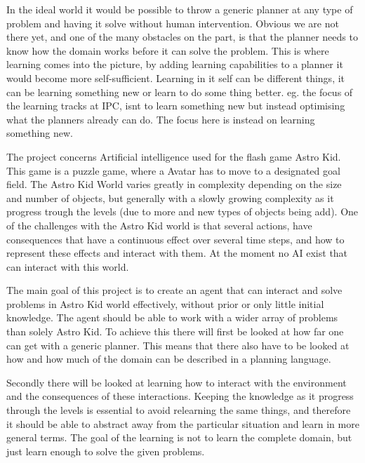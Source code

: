 	In the ideal world it would be possible to throw a generic planner at any type of problem and having it solve without human intervention. Obvious we are not there yet, and one of the many obstacles on the part, is that the planner needs to know how the domain works before it can solve the problem. This is where learning comes into the picture, by adding learning capabilities to a planner it would become more self-sufficient. Learning in it self can be different things, it can be learning something new or learn to do some thing better. eg. the focus of the learning tracks at IPC, isnt to learn something new but instead optimising what the planners already can do. The focus here is instead on learning something new. %



	The project concerns Artificial intelligence used for the flash game Astro Kid. This game is a puzzle game, where a Avatar has to move to a designated goal field. The Astro Kid World varies greatly in complexity depending on the size and number of objects, but generally with a slowly growing complexity as it progress trough the levels (due to more and new types of objects being add). One of the challenges with the Astro Kid world is that several actions, have consequences that have a continuous effect over several time steps, and how to represent these effects and interact with them. At the moment no AI exist that can interact with this world. 

	The main goal of this project is to create an agent that can interact and solve problems in Astro Kid world effectively, without prior or only little initial knowledge. The agent should be able to work with a wider array of problems than solely Astro Kid. To achieve this there will first be looked at how far one can get with a generic planner. This means that there also have to be looked at how and how much of the domain can be described in a planning language. 

	Secondly there will be looked at learning how to interact with the environment and the consequences of these interactions. Keeping the knowledge as it progress through the levels is essential to avoid relearning the same things, and therefore it should be able to abstract away from the particular situation and learn in more general terms. The goal of the learning is not to learn the complete domain, but just learn enough to solve the given problems.

